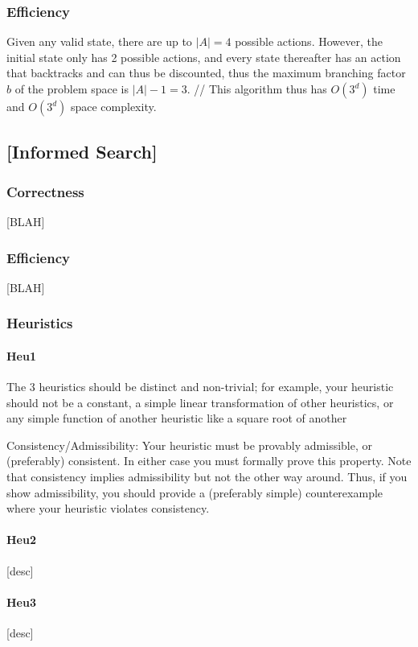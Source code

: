 \documentclass[runningheads]{llncs}
\begin{document}
\subsubsection{Efficiency}
Given any valid state, there are up to $|A|=4$ possible actions. However, the initial state only has 2 possible actions, and every state thereafter has an action that backtracks and can thus be discounted, thus the maximum branching factor $b$ of the problem space is $|A|-1=3$. // This algorithm thus has $O(3^d)$ time and $O(3^d)$ space complexity.

\subsection{[Informed Search]}
\subsubsection{Correctness}
[BLAH]

\subsubsection{Efficiency}
[BLAH]

\subsubsection{Heuristics}
\paragraph{Heu1}
The 3 heuristics should be distinct and non-trivial; for example, your heuristic should not be a constant, a simple linear transformation of other heuristics, or any simple function of another heuristic like a square root of another

Consistency/Admissibility: Your heuristic must be provably admissible, or (preferably) consistent. In either case you must formally prove this property. Note that consistency implies admissibility but not the other way around. Thus, if you show admissibility, you should provide a (preferably simple) counterexample where your heuristic violates consistency.

\paragraph{Heu2}
[desc]

\paragraph{Heu3}
[desc]
\end{document}
